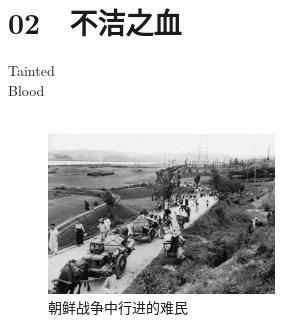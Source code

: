\fancyhead[RO]{{\tiny{\textcolor{Gray}{\FA \ }}}\thepage}
\fancyhead[LE]{{\tiny{\textcolor{Gray}{\FA \ }}}\thepage}
\fancyfoot[LE,RO]{}
\fancyfoot[LO,CE]{}
\fancyfoot[CO,RE]{}
\chapter*{02 {\FA } 不洁之血}
\vspace{15mm}
\begin{flushright}
	\textcolor{PinYinColor}{\EN \huge{Tainted\\
		Blood\\
	\ \\}}
\end{flushright}

\begin{figure}[!htbp]
	\centering
	\includegraphics[width=6cm]{./Chapters/Images/02.jpg}
	\caption*{朝鲜战争中行进的难民}
\end{figure}

